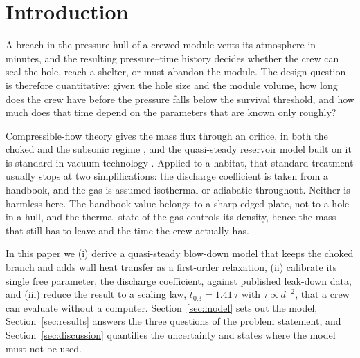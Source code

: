 \section{Introduction}
\label{sec:intro}

A breach in the pressure hull of a crewed module vents its atmosphere in
minutes, and the resulting pressure--time history decides whether the crew
can seal the hole, reach a shelter, or must abandon the module. The design
question is therefore quantitative: given the hole size and the module
volume, how long does the crew have before the pressure falls below the
survival threshold, and how much does that time depend on the parameters
that are known only roughly?

Compressible-flow theory gives the mass flux through an orifice, in both
the choked and the subsonic regime \citep{shapiro1953,anderson2003}, and
the quasi-steady reservoir model built on it is standard in vacuum
technology \citep{landau1987}. Applied to a habitat, that standard
treatment usually stops at two simplifications: the discharge coefficient
is taken from a handbook, and the gas is assumed isothermal or adiabatic
throughout. Neither is harmless here. The handbook value belongs to a
sharp-edged plate, not to a hole in a hull, and the thermal state of the
gas controls its density, hence the mass that still has to leave and the
time the crew actually has.

In this paper we (i) derive a quasi-steady blow-down model that keeps the
choked branch and adds wall heat transfer as a first-order relaxation,
(ii) calibrate its single free parameter, the discharge coefficient,
against published leak-down data, and (iii) reduce the result to a scaling
law, $t_{0.3}=1.41\,\tau$ with $\tau\propto d^{-2}$, that a crew can
evaluate without a computer. Section~\ref{sec:model} sets out the model,
Section~\ref{sec:results} answers the three questions of the problem
statement, and Section~\ref{sec:discussion} quantifies the uncertainty and
states where the model must not be used.
